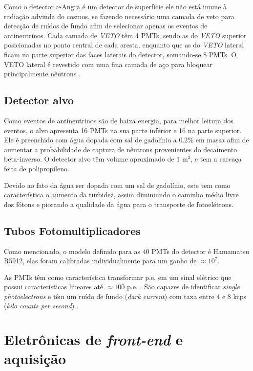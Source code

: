 Como o detector $\nu$-Angra é um detector de superfície ele não está imune à radiação advinda do cosmos, se fazendo necessário uma camada de veto para detecção de ruídos de fundo afim de selecionar apenas os eventos de antineutrinos. Cada camada de \emph{VETO} têm 4 PMTs, sendo as do \emph{VETO} superior posicionadas no ponto central de cada aresta, enquanto que as do \emph{VETO} lateral ficam na parte superior das faces laterais do detector, somando-se 8 PMTs. O VETO lateral é revestido com uma fina camada de aço para bloquear principalmente nêutrons \cite{dion2019}.

\subsection{Detector alvo}

Como eventos de antineutrinos são de baixa energia, para melhor leitura dos eventos, o alvo apresenta 16 PMTs na sua parte inferior e 16 na parte superior. Ele é preenchido com água dopada com sal de gadolínio a $0.2\%$ em massa  afim de aumentar a probabilidade de captura de nêutrons provenientes do decaimento beta-inverso. O detector alvo têm volume aproximado de $1$ m$^3$, e tem a carcaça feita de polipropileno. 


Devido ao fato da água ser dopada com um sal de gadolínio, este tem como característica o aumento da turbidez, assim diminuindo o caminho médio livre dos fótons e piorando a qualidade da água para o transporte de fotoelétrons.

\subsection{Tubos Fotomultiplicadores} \label{subsec:pmt}

Como mencionado, o modelo definido para as $40$ PMTs do detector é Hamamatsu R5912, elas foram calibradas individualmente para um ganho de $\approx10^7$.

As PMTs têm como característica transformar  \ac{p.e.} em um sinal elétrico que possui características lineares até $\approx 100$ p.e. \cite{BABICZ2019554}. São capazes de identificar \emph{single photoelectrons} e têm um ruído de fundo (\emph{dark current}) com taxa entre $4$ e $8$ kcps (\emph{kilo counts per second}) \cite{hamamatsu1998photomultiplier}. 



\section{Eletrônicas de \emph{front-end} e aquisição}

